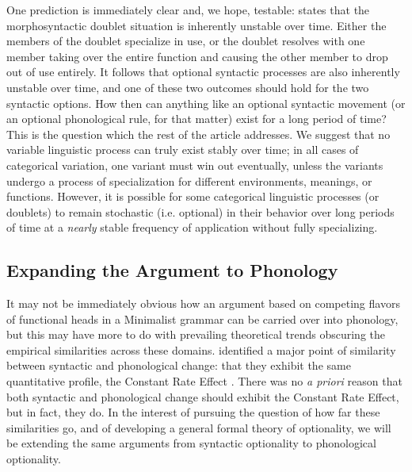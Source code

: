 One prediction is immediately clear and, we hope, testable: \citet{kroch1989,kroch1994} states that the morphosyntactic doublet situation is inherently unstable over time.
Either the members of the doublet specialize in use, or the doublet resolves with one member taking over the entire function and causing the other member to drop out of use entirely.
It follows that optional syntactic processes are also inherently unstable over time, and one of these two outcomes should hold for the two syntactic options.
How then can anything like an optional syntactic movement (or an optional phonological rule, for that matter) exist for a long period of time? This is the question which the rest of the article addresses.
We suggest that no variable linguistic process can truly exist stably over time; in all cases of categorical variation, one variant must win out eventually, unless the variants undergo a process of specialization for different environments, meanings, or functions.
However, it is possible for some categorical linguistic processes (or doublets) to remain stochastic (i.e. optional) in their behavior over long periods of time at a \textsl{nearly} stable frequency of application without fully specializing. 



\subsection{Expanding the Argument to Phonology}

It may not be immediately obvious how an argument based on competing flavors of functional heads in a Minimalist grammar can be carried over into phonology, but this may have more to do with prevailing theoretical trends obscuring the empirical similarities across these domains.
\citet*{fruehwaldgresswallenberg2013} identified a major point of similarity between syntactic and phonological change: that they exhibit the same quantitative profile, the Constant Rate Effect \citep{kroch1989}.
There was no {\it a priori} reason that both syntactic and phonological change should exhibit the Constant Rate Effect, but in fact, they do.
In the interest of pursuing the question of how far these similarities go, and of developing a general formal theory of optionality, we will be extending the same arguments from syntactic optionality to phonological optionality.



